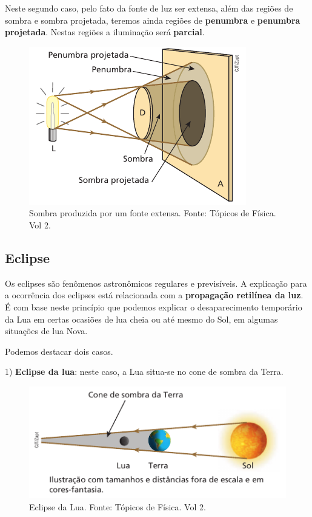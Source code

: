 \documentclass[11pt,twocolumn,oneside]{article}
\begin{document}
Neste segundo caso, pelo fato da fonte de luz ser extensa, além das regiões de sombra e sombra projetada, teremos ainda regiões de \textbf{penumbra} e \textbf{penumbra projetada}. Nestas regiões a iluminação será \textbf{parcial}.


\begin{figure}[h]{}
\centering\includegraphics[width=2.5truein]{img19.png}
\caption{Sombra produzida por um fonte extensa. Fonte: Tópicos de Física. Vol 2.}
\centering
\end{figure}

\hypertarget{x-eclipse}{\subsection{Eclipse}}
Os eclipses são fenômenos astronômicos regulares e previsíveis. A explicação para a ocorrência dos eclipses está relacionada com a \textbf{propagação retilínea da luz}. É com base neste princípio que podemos explicar o desaparecimento temporário da Lua em certas ocasiões de lua cheia ou até mesmo do Sol, em algumas situações de lua Nova.


Podemos destacar dois casos.


1) \textbf{Eclipse da lua}: neste caso, a Lua situa-se no cone de sombra da Terra.


\begin{figure}[h]{}
\centering\includegraphics[width=2.5truein]{img20.png}
\caption{Eclipse da Lua. Fonte: Tópicos de Física. Vol 2.}
\centering
\end{figure}
\end{document}
